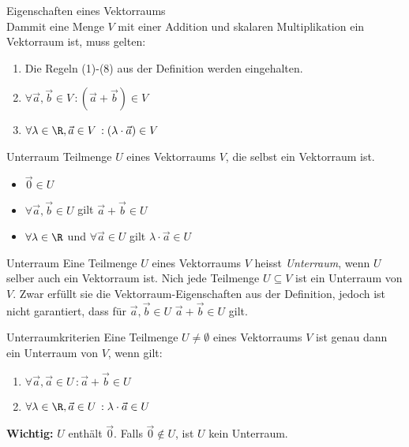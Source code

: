     \begin{theorem}{Eigenschaften eines Vektorraums}\\
        Dammit eine Menge $V$ mit einer Addition und skalaren Multiplikation ein Vektorraum ist, muss gelten:
        \begin{enumerate}
            \item Die Regeln (1)-(8) aus der Definition werden eingehalten.
            \item $\forall \vec{a},\vec{b}\in V\,:(\vec{a}+\vec{b})\in V$
            \item $\forall \lambda\in \R, \vec{a}\in V\,:(\lambda\cdot\vec{a})\in V$
        \end{enumerate}
    \end{theorem}

    \begin{definition}{Unterraum}
        Teilmenge $U$ eines Vektorraums $V$, die selbst ein Vektorraum ist.
        \begin{itemize}
            \item $\overrightarrow{0} \in U$
            \item $\forall \vec{a}, \vec{b} \in U$ gilt $\overrightarrow{a} + \overrightarrow{b} \in U$
            \item $\forall \lambda \in \R$ und $\forall \vec{a} \in U$ gilt $\lambda \cdot \overrightarrow{a} \in U$
        \end{itemize}
        
    \end{definition}

    \begin{definition}{Unterraum}
        Eine Teilmenge $U$ eines Vektorraums $V$ heisst \textit{Unterraum}, wenn $U$ selber auch ein Vektorraum ist.
        Nich jede Teilmenge $U\subseteq V$ ist ein Unterraum von $V$. Zwar erfüllt sie die Vektorraum-Eigenschaften
        aus der Definition, jedoch ist nicht garantiert, dass für $\vec{a},\vec{b}\in U$ $\vec{a}+\vec{b}\in U$ gilt. 
    \end{definition}

    \begin{theorem}{Unterraumkriterien}
        Eine Teilmenge $U\neq\emptyset$ eines Vektorraums $V$ ist genau dann ein Unterraum von $V$, wenn gilt:
        \begin{enumerate}
            \item $\forall \vec{a},\vec{a}\in U\,:\vec{a}+\vec{b}\in U$
            \item $\forall \lambda\in\R,\vec{a}\in U\,:\lambda\cdot\vec{a}\in U$
        \end{enumerate}
        \textbf{Wichtig:} $U$ enthält $\vec{0}$. Falls $\vec{0}\notin U$, ist $U$ kein Unterraum. 
    \end{theorem}

